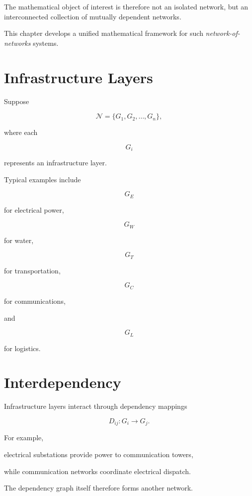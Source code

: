 \documentclass[11pt,fleqn]{book}
\numberwithin{equation}{chapter}
\theoremstyle{plain}
\theoremstyle{definition}
\theoremstyle{remark}
\begin{document}
The mathematical object of interest is therefore not an isolated
network, but an interconnected collection of mutually dependent
networks.

This chapter develops a unified mathematical framework for such
\emph{network-of-networks} systems.


\section{Infrastructure Layers}

Suppose

\[
\mathcal N
=
\{G_1,G_2,\ldots,G_n\},
\]

where each

\[
G_i
\]

represents an infrastructure layer.

Typical examples include

\[
G_E
\]

for electrical power,

\[
G_W
\]

for water,

\[
G_T
\]

for transportation,

\[
G_C
\]

for communications,

and

\[
G_L
\]

for logistics.


\section{Interdependency}

Infrastructure layers interact through dependency mappings

\[
\boxed{
D_{ij}:G_i
\rightarrow
G_j.
}
\]

For example,

electrical substations provide power to communication towers,

while communication networks coordinate electrical dispatch.

The dependency graph itself therefore forms another network.

\end{document}
